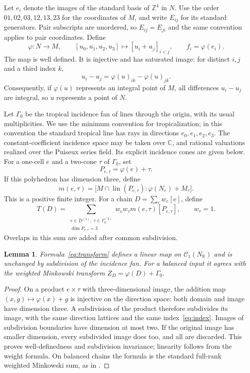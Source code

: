 \documentclass[11pt]{article}
\newtheorem{lemma}[theorem]{Lemma}
\theoremstyle{definition}
\theoremstyle{remark}
\newcommand{\R}{\mathbb R}
\newcommand{\Z}{\mathbb Z}
\newcommand{\Ch}{\mathcal C}
\newcommand{\NR}{N_{\R}}
\newcommand{\lin}{\operatorname{lin}}
\begin{document}
Let $e_i$ denote the images of the standard basis of $\Z^4$ in $N$.
Use the order $01,02,03,12,13,23$ for the coordinates of $M$, and write
$E_{ij}$ for its standard generators. Pair subscripts are unordered,
so $E_{ij}=E_{ji}$ and the same convention applies to pair coordinates.
Define
\[
 \varphi:N\longrightarrow M,\qquad
 [u_0,u_1,u_2,u_3]\longmapsto[u_i+u_j]_{i<j},
 \qquad f_i=\varphi(e_i).
\]
The map is well defined. It is injective and has saturated image: for
distinct $i,j$ and a third index $k$,
\[
 u_i-u_j=\varphi(u)_{ik}-\varphi(u)_{jk}.
\]
Consequently, if $\varphi(u)$ represents an integral point of $M$, all
differences $u_i-u_j$ are integral, so $u$ represents a point of $N$.

Let $\Gamma_0$ be the tropical incidence fan of lines through the origin,
with its usual multiplicities. We use the minimum convention for
tropicalization; in this convention the standard tropical line has rays
in directions $e_0,e_1,e_2,e_3$. The constant-coefficient incidence space
may be taken over $\mathbb C$, and rational valuations realized over
the Puiseux series field. Its explicit incidence cones are given below.
For a one-cell $e$ and a two-cone $\tau$ of $\Gamma_0$, set
\[
 P_{e,\tau}=\varphi(e)+\tau.
\]
If this polyhedron has dimension three, define
\begin{equation}\label{eq:index}
 m(e,\tau)=
 \bigl[M\cap\lin(P_{e,\tau}):\varphi(N_e)+M_\tau\bigr].
\end{equation}
This is a positive finite integer. For a chain $D=\sum_e w_e[e]$, define
\begin{equation}\label{eq:transform}
 T(D)=\sum_{\substack{e\in D^{(1)},\ \tau\in\Gamma_0^{(2)}\\
                         \dim P_{e,\tau}=3}}
 w_e w_\tau m(e,\tau)[P_{e,\tau}],
 \qquad w_\tau=1.
\end{equation}
Overlaps in this sum are added after common subdivision.

\begin{lemma}\label{lem:well-defined}
Formula~\eqref{eq:transform} defines a linear map on $\Ch_1(\NR)$
and is unchanged by subdivision of the incidence fan. For a balanced
input it agrees with the weighted Minkowski transform
$Z_D=\varphi(D)+\Gamma_0$.
\end{lemma}

\begin{proof}
On a product $e\times\tau$ with three-dimensional image, the addition
map $(x,g)\mapsto\varphi(x)+g$ is injective on the direction space:
both domain and image have dimension three. A subdivision of the product
therefore subdivides its image, with the same direction lattices and the
same index~\eqref{eq:index}. Images of subdivision boundaries have
dimension at most two. If the original image has smaller dimension,
every subdivided image does too, and all are discarded. This proves
well-definedness and subdivision invariance; linearity follows from the
weight formula. On balanced chains the formula is the standard
full-rank weighted Minkowski sum, as in
\cite[Section~2, equation~(5) and Definition~2.7]{Tripoli}.
\end{proof}
\end{document}
